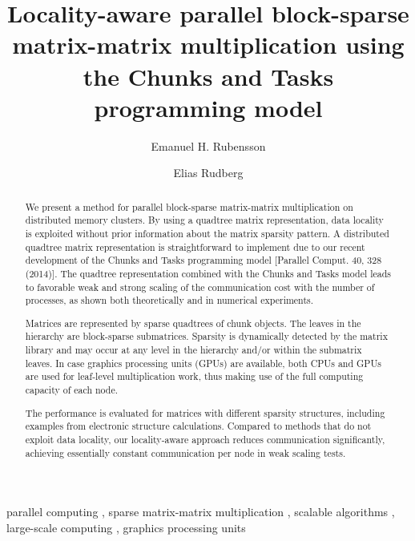 \documentclass{elsarticle}
\begin{document}
\begin{frontmatter}



\title{Locality-aware parallel block-sparse matrix-matrix multiplication using the
  Chunks and Tasks programming model}


\author{Emanuel H. Rubensson}
\author{Elias Rudberg}
\address{Division of Scientific Computing, Department of Information Technology, Uppsala University, Box 337, SE-751 05 Uppsala, Sweden}




\begin{abstract} 
  We present a method for parallel block-sparse matrix-matrix
  multiplication on distributed memory clusters. By using a quadtree
  matrix representation, data locality is exploited without prior
  information about the matrix sparsity pattern.  A distributed
  quadtree matrix representation is straightforward to implement due
  to our recent development of the Chunks and Tasks programming model
  [Parallel Comput. 40, 328 (2014)].  The quadtree representation
  combined with the Chunks and Tasks model leads to favorable weak and
  strong scaling of the communication cost with the number of
  processes, as shown both theoretically and in numerical experiments.

  Matrices are represented by sparse quadtrees of chunk objects.  The
  leaves in the hierarchy are block-sparse submatrices. Sparsity
  is dynamically detected by the matrix library and
  may
  occur at any level in the hierarchy and/or within the submatrix
  leaves. In case graphics processing units (GPUs) are available, both
  CPUs and GPUs are used for leaf-level multiplication work, thus
  making use of the full computing capacity of each node.

  The performance
  is evaluated for matrices with
  different sparsity structures, including examples from electronic structure calculations.
  Compared to methods that do not exploit data locality, our
  locality-aware approach reduces communication significantly,
  achieving essentially constant communication per node in weak scaling tests.


  
  
  

\end{abstract}

\begin{keyword}
parallel computing \sep
sparse matrix-matrix multiplication \sep
scalable algorithms \sep
large-scale computing \sep
graphics processing units
\end{keyword}

\end{frontmatter}
\end{document}
